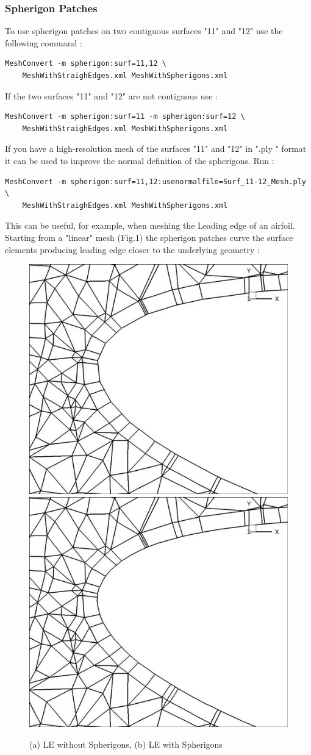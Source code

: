 \subsubsection{Spherigon Patches}
To use spherigon patches on two contiguous surfaces "11" and "12" use the following command :
\begin{lstlisting}[style=BashInputStyle]
MeshConvert -m spherigon:surf=11,12 \
    MeshWithStraighEdges.xml MeshWithSpherigons.xml
\end{lstlisting}
If the two surfaces "11" and "12" are not contiguous use :
\begin{lstlisting}[style=BashInputStyle]
MeshConvert -m spherigon:surf=11 -m spherigon:surf=12 \
    MeshWithStraighEdges.xml MeshWithSpherigons.xml
\end{lstlisting}
If you have a high-resolution mesh of the surfaces "11" and "12" in ".ply " format it can be used to improve the normal definition of the spherigons. Run :
\begin{lstlisting}[style=BashInputStyle]
MeshConvert -m spherigon:surf=11,12:usenormalfile=Surf_11-12_Mesh.ply \
    MeshWithStraighEdges.xml MeshWithSpherigons.xml 
\end{lstlisting}
This can be useful, for example, when meshing the Leading edge of an airfoil. Starting from a "linear" mesh (Fig.1) the spherigon patches curve the surface elements producing leading edge closer to the underlying geometry :
\begin{figure}[!htbp]
\begin{center}
\includegraphics[width = 0.47 \textwidth]{Figures/noSphnoBL.jpg}
\includegraphics[width = 0.47 \textwidth]{Figures/SphnoBL.jpg}
\caption{(a) LE without Spherigons, (b) LE with Spherigons}
\label{fig:}
\end{center}
\end{figure}
